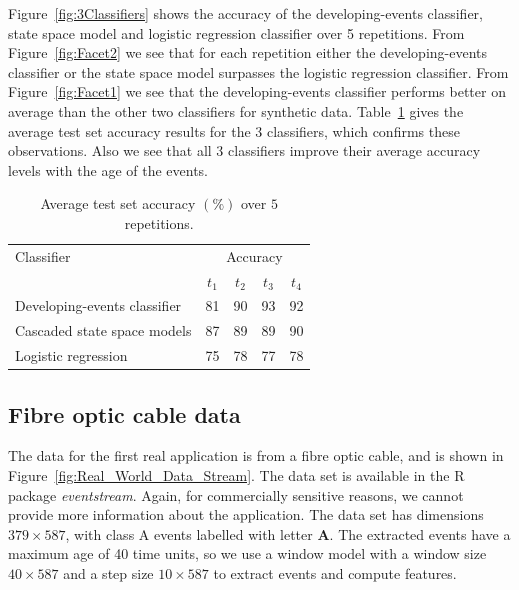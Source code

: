 \documentclass[a4paper,11pt]{article}
\begin{document}
Figure~\ref{fig:3Classifiers} shows the accuracy of the developing-events classifier, state space model and logistic regression classifier over 5 repetitions.  From Figure~\ref{fig:Facet2} we see that for each repetition either the developing-events classifier or the state space model surpasses the logistic regression classifier. From Figure~\ref{fig:Facet1} we see that the developing-events classifier performs better on average than the other two classifiers for synthetic data. Table~\ref{tab:Results_Synthetic} gives the average test set accuracy results for the 3 classifiers, which confirms these observations. Also we see that all 3 classifiers improve their average accuracy levels with the age of the events.

\begin{table}[!ht]
  \centering
  \begin{tabular}{lcccc}
    \toprule
    Classifier                   & \multicolumn{4}{c}{Accuracy} \\
    \cmidrule{2-5}
                                 & $t_1$ & $t_2$ & $t_3$ & $t_4$ \\
    \midrule
    Developing-events classifier & 81    & 90    & 93    & 92    \\
    Cascaded state space models  & 87    & 89    & 89    & 90    \\
    Logistic regression          & 75    & 78    & 77    & 78    \\
    \bottomrule
  \end{tabular}
    \caption{Average test set accuracy $(\%)$ over $5$ repetitions.}\label{tab:Results_Synthetic}
\end{table}

\subsection{Fibre optic cable data}

The data for the first real application is from a fibre optic cable, and is shown in Figure~\ref{fig:Real_World_Data_Stream}.  The data set is available in the R package \textit{eventstream}. Again, for commercially sensitive reasons, we cannot provide more information about the application. The data set has dimensions $379 \times 587$, with class A events labelled with letter \textbf{A}. The extracted events have a maximum age of 40 time units, so we use a window model with a window size $40 \times 587$ and a step size $10 \times 587$ to extract events and compute features.
\end{document}
